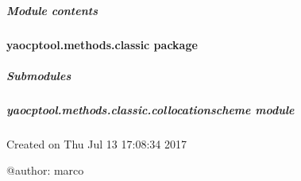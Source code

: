 \documentclass[letterpaper,10pt,english]{sphinxmanual}
\begin{document}
\subparagraph{Module contents}
\label{\detokenize{yaocptool.methods.base:module-yaocptool.methods.base}}\label{\detokenize{yaocptool.methods.base:module-contents}}

\paragraph{yaocptool.methods.classic package}
\label{\detokenize{yaocptool.methods.classic:yaocptool-methods-classic-package}}\label{\detokenize{yaocptool.methods.classic::doc}}

\subparagraph{Submodules}
\label{\detokenize{yaocptool.methods.classic:submodules}}

\subparagraph{yaocptool.methods.classic.collocationscheme module}
\label{\detokenize{yaocptool.methods.classic:module-yaocptool.methods.classic.collocationscheme}}\label{\detokenize{yaocptool.methods.classic:yaocptool-methods-classic-collocationscheme-module}}
Created on Thu Jul 13 17:08:34 2017

@author: marco
\end{document}
